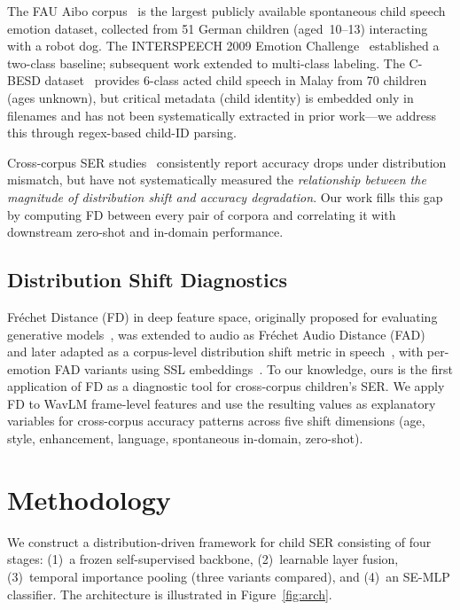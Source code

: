 \documentclass[11pt,a4paper]{article}
\begin{document}
The FAU Aibo corpus~\cite{batliner2011fau,steidl2009fau} is the largest
publicly available spontaneous child speech emotion dataset, collected from 51
German children (aged~10--13) interacting with a robot dog. The INTERSPEECH
2009 Emotion Challenge~\cite{schuller2009interspeech} established a two-class
baseline; subsequent work extended to multi-class labeling. The C-BESD
dataset~\cite{sazali2023besd,rao2024cbesd} provides 6-class acted child speech
in Malay from 70 children (ages unknown), but critical metadata (child identity)
is embedded only in filenames and has not been systematically extracted in prior
work---we address this through regex-based child-ID parsing.

Cross-corpus SER studies~\cite{schuller2010cross,latif2024cross} consistently
report accuracy drops under distribution mismatch, but have not systematically
measured the \textit{relationship between the magnitude of distribution shift
and accuracy degradation}. Our work fills this gap by computing FD between
every pair of corpora and correlating it with downstream zero-shot and
in-domain performance.

\subsection{Distribution Shift Diagnostics}

Fr\'{e}chet Distance (FD) in deep feature space, originally proposed for
evaluating generative models~\cite{heusel2017gans}, was extended to audio
as Fr\'echet Audio Distance (FAD)~\cite{kilgour2018fad} and later adapted as a
corpus-level distribution shift metric in speech~\cite{le2024dist}, with
per-emotion FAD variants using SSL embeddings~\cite{sun2024fad}. To our
knowledge, ours is the first application of FD as a diagnostic tool for
cross-corpus children's SER. We apply FD to WavLM frame-level features and use
the resulting values as explanatory variables for cross-corpus accuracy patterns
across five shift dimensions (age, style, enhancement, language, spontaneous
in-domain, zero-shot).


\section{Methodology}
\label{sec:methodology}

We construct a distribution-driven framework for child SER consisting of four
stages: (1)~a frozen self-supervised backbone, (2)~learnable layer fusion,
(3)~temporal importance pooling (three variants compared), and (4)~an SE-MLP
classifier. The architecture is illustrated in Figure~\ref{fig:arch}.
\end{document}
